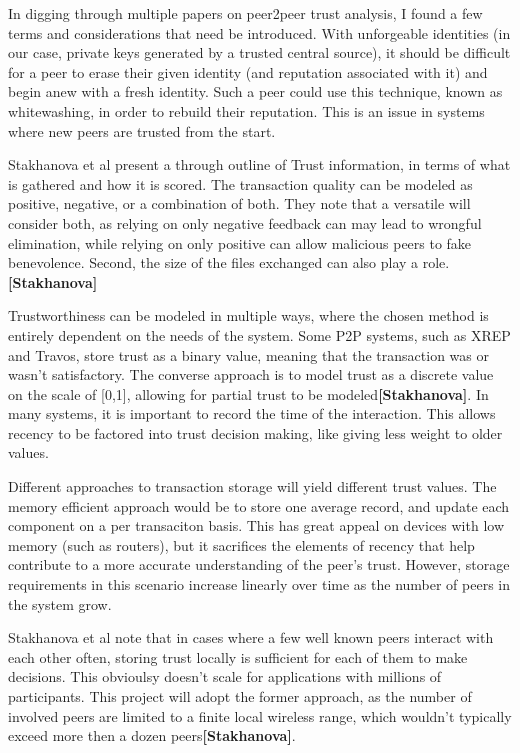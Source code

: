 \documentclass[12pt]{article}
\newcommand{\lcite}[1]
{{\bfseries\color{orange}[#1]}}
\begin{document}
			In digging through multiple papers on peer2peer trust analysis, I found a few terms and considerations that need be introduced. With unforgeable identities (in our case, private keys generated by a trusted central source), it should be difficult for a peer to erase their given identity (and reputation associated with it) and begin anew with a fresh identity. Such a peer could use this technique, known as whitewashing, in order to rebuild their reputation. This is an issue in systems where new peers are trusted from the start.

			Stakhanova et al present a through outline of Trust information, in terms of what is gathered and how it is scored. The transaction quality can be modeled as positive, negative, or a combination of both. They note that a versatile will consider both, as relying on only negative feedback can may lead to wrongful elimination, while relying on only positive can allow malicious peers to fake benevolence. Second, the size of the files exchanged can also play a role.\lcite{Stakhanova}

			Trustworthiness can be modeled in multiple ways, where the chosen method is entirely dependent on the needs of the system. Some P2P systems, such as XREP and Travos, store trust as a binary value, meaning that the transaction was or wasn't satisfactory. The converse approach is to model trust as a discrete value on the scale of [0,1], allowing for partial trust to be modeled\lcite{Stakhanova}. In many systems, it is important to record the time of the interaction. This allows recency to be factored into trust decision making, like giving less weight to older values.

			Different approaches to transaction storage will yield different trust values. The memory efficient approach would be to store one average record, and update each component on a per transaciton basis. This has great appeal on devices with low memory (such as routers), but it sacrifices the elements of recency that help contribute to a more accurate understanding of the peer's trust. However, storage requirements in this scenario increase linearly over time as the number of peers in the system grow.

			Stakhanova et al note that in cases where a few well known peers interact with each other often, storing trust locally is sufficient for each of them to make decisions. This obvioulsy doesn't scale for applications with millions of participants. This project will adopt the former approach, as the number of involved peers are limited to a finite local wireless range, which wouldn't typically exceed more then a dozen peers\lcite{Stakhanova}.
\end{document}
